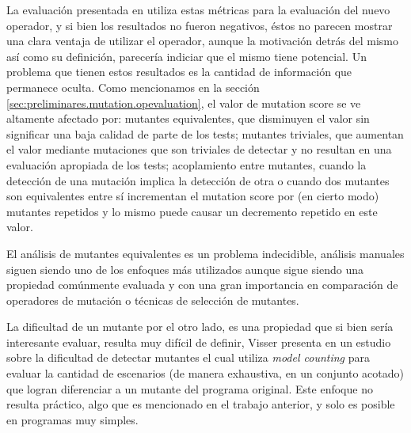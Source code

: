 La evaluaci\'on presentada en \cite{bibliography.mutation.operators.beeBridaS17} utiliza estas m\'etricas para la evaluaci\'on del nuevo operador, y si bien los resultados no fueron negativos, \'estos no parecen mostrar una clara ventaja de utilizar el operador, aunque la motivaci\'on detr\'as del mismo as\'i como su definici\'on, parecer\'ia indiciar que el mismo tiene potencial. Un problema que tienen estos resultados es la cantidad de informaci\'on que permanece oculta. Como mencionamos en la secci\'on \ref{sec:preliminares.mutation.opevaluation}, el valor de mutation score se ve altamente afectado por: mutantes equivalentes, que disminuyen el valor sin significar una baja calidad de parte de los tests; mutantes triviales, que aumentan el valor mediante mutaciones que son triviales de detectar y no resultan en una evaluaci\'on apropiada de los tests; acoplamiento entre mutantes, cuando la detecci\'on de una mutaci\'on implica la detecci\'on de otra o cuando dos mutantes son equivalentes entre s\'i incrementan el mutation score por (en cierto modo) mutantes repetidos y lo mismo puede causar un decremento repetido en este valor.

El an\'alisis de mutantes equivalentes es un problema indecidible, an\'alisis manuales siguen siendo uno de los enfoques m\'as utilizados aunque sigue siendo una propiedad com\'unmente evaluada y con una gran importancia en comparaci\'on de operadores de mutaci\'on o t\'ecnicas de selecci\'on de mutantes.

La dificultad de un mutante por el otro lado, es una propiedad que si bien ser\'ia interesante evaluar, resulta muy dif\'icil de definir, Visser presenta en \cite{bibliography.mutation.evaluation.hardnessVisser} un estudio sobre la dificultad de detectar mutantes el cual utiliza \emph{model counting} para evaluar la cantidad de escenarios (de manera exhaustiva, en un conjunto acotado) que logran diferenciar a un mutante del programa original. Este enfoque no resulta pr\'actico, algo que es mencionado en el trabajo anterior, y solo es posible en programas muy simples.

